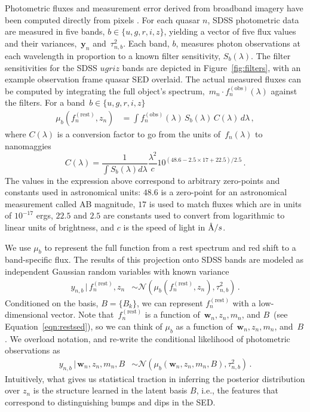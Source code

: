 \documentclass{article} %
\begin{document}
Photometric fluxes and measurement error derived from broadband imagery have been computed directly from pixels \cite{stoughton2002sloan}.  
For each quasar $n$, SDSS photometric data are measured in five bands, ${b \in \{u,g,r,i,z\}}$, yielding a vector of five flux values and their variances,~$\mathbf{y}_n$ and~$\tau^2_{n, b}$.  
Each band, $b$, measures photon observations at each wavelength in proportion to a known filter sensitivity, $S_{b}(\lambda)$. 
The filter sensitivities for the SDSS $ugriz$ bands are depicted in Figure~\ref{fig:filters}, with an example observation frame quasar SED overlaid.  
The actual measured fluxes can be computed by integrating the full object's spectrum,~${m_n \cdot f_n^{(\text{obs})}(\lambda)}$ against the filters.
For a band~${b \in \{u, g, r, i, z \}}$
\begin{align}
  \mu_b(f_n^{(\text{rest})}, z_n) &= \int f^{(\text{obs})}_n(\lambda) \,S_b(\lambda)\, C(\lambda) \,d \lambda \,,
\end{align}
where $C(\lambda)$ is a conversion factor to go from the units of~$f_n(\lambda)$ to nanomaggies
\begin{equation*}
C(\lambda) = \frac{1}{\int S_b(\lambda) d\lambda} \frac{\lambda^2}{c} 10^{(48.6-2.5\times 17+22.5)/2.5} \, .
\end{equation*}
The values in the expression above correspond to arbitrary zero-points and constants used in astronomical units: $48.6$ is a zero-point for an astronomical measurement called AB magnitude, $17$ is used to match fluxes which are in units of $10^{-17}$ ergs, $22.5$ and $2.5$ are constants used to convert from logarithmic to linear units of brightness, and $c$ is the speed of light in $\textup{\AA}/s$.  

 We use $\mu_b$ to represent the full function from a rest spectrum and red shift to a band-specific flux.
 The results of this projection onto SDSS bands are modeled as independent Gaussian random variables with known variance
\begin{align}
  y_{n,b}\, |\, f_n^{(\text{rest})}, z_n &\sim \mathcal{N}( \mu_b(f_n^{(\text{rest})}, z_n), \tau^2_{n,b} ) \, .
\end{align}
Conditioned on the basis, ${B = \{B_k\}}$, we can represent $f_n^{(\text{rest})}$ with a low-dimensional vector.
Note that~$f_n^{(\text{rest})}$ is a function of~${\mathbf{w}_n, z_n, m_n}$, and $B$~(see Equation~\ref{eqn:restsed}), so we can think of $\mu_b$ as a function of~${\mathbf{w}_n, z_n, m_n}$, and~$B$.
We overload notation, and re-write the conditional likelihood of photometric observations as
\begin{align}
    y_{n,b} \,|\, \mathbf{w}_n, z_n, m_n, B &\sim \mathcal{N}( \mu_b(\mathbf{w}_n, z_n, m_n, B), \tau^2_{n,b} ) \, .
   \label{eq:phot}
\end{align}
Intuitively, what gives us statistical traction in inferring the posterior distribution over $z_n$ is the structure learned in the latent basis $B$, i.e., the features that correspond to distinguishing bumps and dips in the SED.
\end{document}
